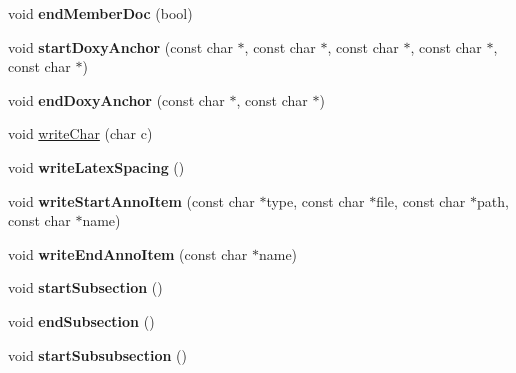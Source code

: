 \begin{DoxyCompactItemize}
\item 
\hypertarget{class_latex_generator_ab4c60a384c219329e0dfd963e34336eb}{void {\bfseries end\-Member\-Doc} (bool)}\label{class_latex_generator_ab4c60a384c219329e0dfd963e34336eb}

\item 
\hypertarget{class_latex_generator_adbd5f10ab281c6d42fa535ae5834ee60}{void {\bfseries start\-Doxy\-Anchor} (const char $\ast$, const char $\ast$, const char $\ast$, const char $\ast$, const char $\ast$)}\label{class_latex_generator_adbd5f10ab281c6d42fa535ae5834ee60}

\item 
\hypertarget{class_latex_generator_acb8477967f0385b221e6adcc8c9cc67a}{void {\bfseries end\-Doxy\-Anchor} (const char $\ast$, const char $\ast$)}\label{class_latex_generator_acb8477967f0385b221e6adcc8c9cc67a}

\item 
void \hyperlink{class_latex_generator_a0031a638b9159c2d16d2988da4b901ab}{write\-Char} (char c)
\item 
\hypertarget{class_latex_generator_a0024111efcef4c86c58a90626442526b}{void {\bfseries write\-Latex\-Spacing} ()}\label{class_latex_generator_a0024111efcef4c86c58a90626442526b}

\item 
\hypertarget{class_latex_generator_a33695af2d50fc8c46a5ba1eb806e7ab5}{void {\bfseries write\-Start\-Anno\-Item} (const char $\ast$type, const char $\ast$file, const char $\ast$path, const char $\ast$name)}\label{class_latex_generator_a33695af2d50fc8c46a5ba1eb806e7ab5}

\item 
\hypertarget{class_latex_generator_aab3b8288c28235bcf5a4b99a84a8c87a}{void {\bfseries write\-End\-Anno\-Item} (const char $\ast$name)}\label{class_latex_generator_aab3b8288c28235bcf5a4b99a84a8c87a}

\item 
\hypertarget{class_latex_generator_a0e68709c755fc3aef30de8ee8ccb3080}{void {\bfseries start\-Subsection} ()}\label{class_latex_generator_a0e68709c755fc3aef30de8ee8ccb3080}

\item 
\hypertarget{class_latex_generator_a3fb66f3466cdfc1a0a77b8b6282dc0e8}{void {\bfseries end\-Subsection} ()}\label{class_latex_generator_a3fb66f3466cdfc1a0a77b8b6282dc0e8}

\item 
\hypertarget{class_latex_generator_a990a0621ea42a9028bb4162b40be4f61}{void {\bfseries start\-Subsubsection} ()}\label{class_latex_generator_a990a0621ea42a9028bb4162b40be4f61}


\end{DoxyCompactItemize}
